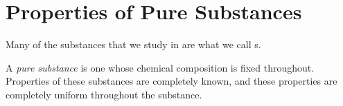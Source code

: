 \section{Properties of Pure Substances}\label{sec:Properties_Pure_Substances}
Many of the substances that we study in  are what we call s.

\begin{definition}\label{def:Pure_Substance}
  A \emph{pure substance} is one whose chemical composition is fixed throughout.
  Properties of these substances are completely known, and these properties are completely uniform throughout the substance.
\end{definition}


